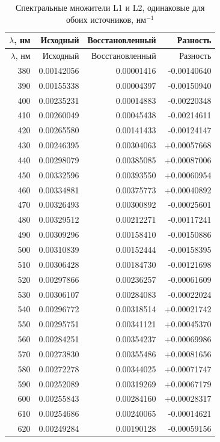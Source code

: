 \begin{longtable}{@{}rrrr@{}}
\caption{Спектральные множители L1 и L2, одинаковые для обоих источников, нм$^{-1}$}\\
\toprule $\lambda$, нм & Исходный & Восстановленный & Разность\\\midrule\endfirsthead
\toprule $\lambda$, нм & Исходный & Восстановленный & Разность\\\midrule\endhead
380 & 0.00142056 & 0.00001416 & -0.00140640 \\
390 & 0.00155338 & 0.00004397 & -0.00150940 \\
400 & 0.00235231 & 0.00014883 & -0.00220348 \\
410 & 0.00260049 & 0.00045438 & -0.00214611 \\
420 & 0.00265580 & 0.00141433 & -0.00124147 \\
430 & 0.00246395 & 0.00304063 & +0.00057668 \\
440 & 0.00298079 & 0.00385085 & +0.00087006 \\
450 & 0.00332596 & 0.00393550 & +0.00060954 \\
460 & 0.00334881 & 0.00375773 & +0.00040892 \\
470 & 0.00326493 & 0.00300892 & -0.00025601 \\
480 & 0.00329512 & 0.00212271 & -0.00117241 \\
490 & 0.00309296 & 0.00158410 & -0.00150886 \\
500 & 0.00310839 & 0.00152444 & -0.00158395 \\
510 & 0.00306428 & 0.00184730 & -0.00121698 \\
520 & 0.00297866 & 0.00236257 & -0.00061609 \\
530 & 0.00306107 & 0.00284083 & -0.00022024 \\
540 & 0.00296772 & 0.00318514 & +0.00021742 \\
550 & 0.00295751 & 0.00341121 & +0.00045370 \\
560 & 0.00284251 & 0.00354237 & +0.00069986 \\
570 & 0.00273830 & 0.00355486 & +0.00081656 \\
580 & 0.00272278 & 0.00344025 & +0.00071747 \\
590 & 0.00252089 & 0.00319269 & +0.00067179 \\
600 & 0.00255843 & 0.00284160 & +0.00028317 \\
610 & 0.00254686 & 0.00240065 & -0.00014621 \\
620 & 0.00249284 & 0.00190128 & -0.00059156 \\

\end{longtable}
